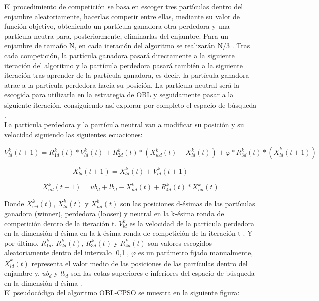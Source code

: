 El procedimiento de competición se basa en escoger tres partículas dentro del enjambre aleatoriamente, hacerlas competir entre ellas, mediante su valor de función objetivo, obteniendo un partícula ganadora otra perdedora y una partícula neutra para, posteriormente, eliminarlas del enjambre. Para un enjambre de tamaño N, en cada iteración del algoritmo se realizarán N/3 \cite{oblcpso}. Tras cada competición, la partícula ganadora pasará directamente a la siguiente iteración del algoritmo y la partícula perdedora pasará también a la siguiente iteración tras aprender de la partícula ganadora, es decir, la partícula ganadora atrae a la partícula perdedora hacia su posición. La partícula neutral será la escogida para utilizarla en la estrategia de OBL y seguidamente pasar a la siguiente iteración, consiguiendo así explorar por completo el espacio de búsqueda \cite{oblcpso}. \\

La partícula perdedora y la partícula neutral van a modificar su posición y su velocidad siguiendo las siguientes ecuaciones:

\begin{equation} \label{eq:7}
    V^{k}_{ld}(t+1) = R^{k}_{1d}(t) * V^{k}_{ld}(t) + R^{k}_{2d}(t) * (X^{k}_{wd}(t) - X^{k}_{ld}(t)) + \varphi * R^{k}_{3d}(t) * (\overline{X}^{k}_{ld}(t+1)) 
\end{equation}

\begin{equation} \label{eq:8}
     X^{k}_{ld}(t+1) = X^{k}_{ld}(t) + V^{k}_{ld}(t+1)
\end{equation}

\begin{equation} \label{eq:9}
     X^{k}_{nd}(t+1) = ub_{d} + lb_{d} - X^{k}_{nd}(t) + R^{k}_{4d}(t) * X^{k}_{nd}(t)
\end{equation}

Donde $X^{k}_{wd}(t)$, $ X^{k}_{ld}(t)$ y $ X^{k}_{nd}(t)$ son las posiciones d-ésimas de las partículas ganadora (winner), perdedora (looser) y neutral en la k-ésima ronda de competición dentro de la iteración t. $V^{k}_{ld}$ es la velocidad de la partícula perdedora en la dimensión d-ésima en la k-ésima ronda de competición de la iteración t \cite{oblcpso}. Y por último, $R^{k}_{1d}$, $R^{k}_{2d}(t)$, $R^{k}_{3d}(t)$ y $R^{k}_{4d}(t)$ son valores escogidos aleatoriamente dentro del intervalo [0,1], $\varphi$ es un parámetro fijado manualmente, $\overline{X}^{k}_{ld}(t)$ representa el valor medio de las posiciones de las partículas dentro del enjambre y, $ub_{d}$ y $lb_{d}$ son las cotas superiores e inferiores del espacio de búsqueda en la dimensión d-ésima \cite{oblcpso}. \\
El pseudocódigo del algoritmo OBL-CPSO se muestra en la siguiente figura: 


